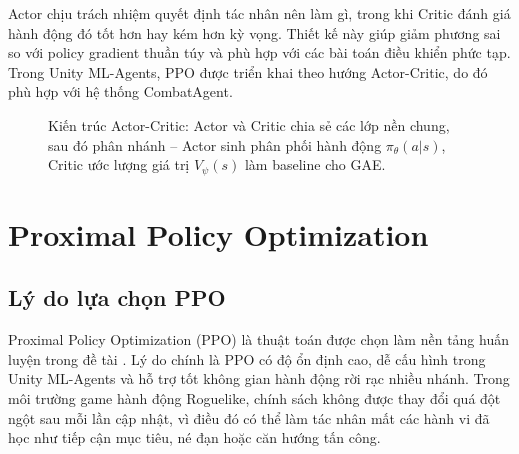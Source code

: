 Actor chịu trách nhiệm quyết định tác nhân nên làm gì, trong khi Critic đánh giá hành động đó tốt hơn hay kém hơn kỳ vọng. Thiết kế này giúp giảm phương sai so với policy gradient thuần túy và phù hợp với các bài toán điều khiển phức tạp. Trong Unity ML-Agents, PPO được triển khai theo hướng Actor-Critic, do đó phù hợp với hệ thống CombatAgent.

\begin{figure}[H]
\centering
{}
\caption{Kiến trúc Actor-Critic: Actor và Critic chia sẻ các lớp nền chung, sau đó phân nhánh -- Actor sinh phân phối hành động $\pi_\theta(a|s)$, Critic ước lượng giá trị $V_\psi(s)$ làm baseline cho GAE.}
\label{fig:actor_critic}
\end{figure}

\section{Proximal Policy Optimization}
\subsection{Lý do lựa chọn PPO}

Proximal Policy Optimization (PPO) là thuật toán được chọn làm nền tảng huấn luyện trong đề tài \cite{Schulman2017}. Lý do chính là PPO có độ ổn định cao, dễ cấu hình trong Unity ML-Agents và hỗ trợ tốt không gian hành động rời rạc nhiều nhánh. Trong môi trường game hành động Roguelike, chính sách không được thay đổi quá đột ngột sau mỗi lần cập nhật, vì điều đó có thể làm tác nhân mất các hành vi đã học như tiếp cận mục tiêu, né đạn hoặc căn hướng tấn công.

